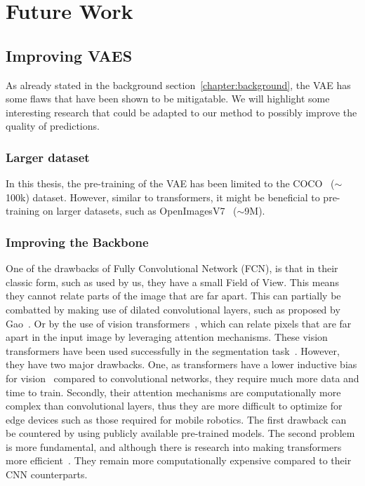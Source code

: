 \chapter{Future Work}\label{chapter:future_work}

\section{Improving VAES}
As already stated in the background section~\ref{chapter:background}, the VAE has some flaws that have been shown to be mitigatable. We will highlight some interesting research that could be adapted to our method to possibly improve the quality of predictions.
\subsection{Larger dataset}
In this thesis, the pre-training of the VAE has been limited to the COCO~\cite{lin2015microsoftcococommonobjects} ($\sim$100k) dataset. However, similar to transformers, it might be beneficial to pre-training on larger datasets, such as OpenImagesV7~\cite{OpenImages} ($\sim$9M).

\subsection{Improving the Backbone}
One of the drawbacks of Fully Convolutional Network (FCN), is that in their classic form, such as used by us, they have a small Field of View. This means they cannot relate parts of the image that are far apart. This can partially be combatted by making use of dilated convolutional layers, such as proposed by Gao~\cite{gao2023rethinking}. Or by the use of vision transformers~\cite{dosovitskiy2021image}, which can relate pixels that are far apart in the input image by leveraging attention mechanisms. These vision transformers have been used successfully in the segmentation task~\cite{xie2021segformer,chen2022vision}. However, they have two major drawbacks. One, as transformers have a lower inductive bias for vision~\cite{dosovitskiy2021image} compared to convolutional networks, they require much more data and time to train. Secondly, their attention mechanisms are computationally more complex than convolutional layers, thus they are more difficult to optimize for edge devices such as those required for mobile robotics. The first drawback can be countered by using publicly available pre-trained models. The second problem is more fundamental, and although there is research into making transformers more efficient~\cite{li2022efficientformer,Yu2021MetaFormerIA}. They remain more computationally expensive compared to their CNN counterparts.

